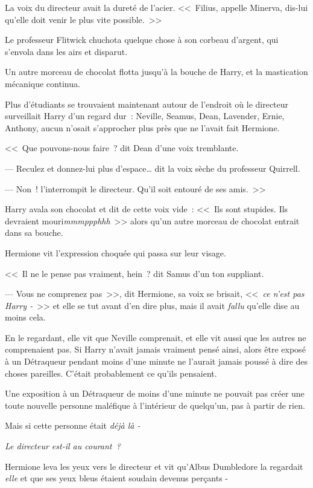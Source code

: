 La voix du directeur avait la dureté de l'acier. <<~Filius, appelle Minerva, dis-lui qu'elle doit venir le plus vite possible.~>>

Le professeur Flitwick chuchota quelque chose à son corbeau d'argent, qui s'envola dans les airs et disparut.

Un autre morceau de chocolat flotta jusqu'à la bouche de Harry, et la mastication mécanique continua.

Plus d'étudiants se trouvaient maintenant autour de l'endroit où le directeur surveillait Harry d'un regard dur~: Neville, Seamus, Dean, Lavender, Ernie, Anthony, aucun n'osait s'approcher plus près que ne l'avait fait Hermione.

<<~Que pouvons-nous faire~? dit Dean d'une voix tremblante.

--- Reculez et donnez-lui plus d'espace… dit la voix sèche du professeur Quirrell.

--- Non~! l'interrompit le directeur. Qu'il soit entouré de ses amis.~>>

Harry avala son chocolat et dit de cette voix vide~: <<~Ils sont stupides. Ils devraient mouri\emph{mmmppphhh}~>> alors qu'un autre morceau de chocolat entrait dans sa bouche.

Hermione vit l'expression choquée qui passa sur leur visage.

<<~Il ne le pense pas vraiment, hein~? dit Samus d'un ton suppliant.

--- Vous ne comprenez pas~>>, dit Hermione, sa voix se brisait, <<~\emph{ce n'est pas Harry -}~>> et elle se tut avant d'en dire plus, mais il avait \emph{fallu} qu'elle dise au moins cela.

En le regardant, elle vit que Neville comprenait, et elle vit aussi que les autres ne comprenaient pas. Si Harry n'avait jamais vraiment pensé ainsi, alors être exposé à un Détraqueur pendant moins d'une minute ne l'aurait jamais poussé à dire des choses pareilles. C'était probablement ce qu'ils pensaient.

Une exposition à un Détraqueur de moins d'une minute ne pouvait pas créer une toute nouvelle personne maléfique à l'intérieur de quelqu'un, pas à partir de rien.

Mais si cette personne était \emph{déjà là -}

\emph{Le directeur est-il au courant~?}

Hermione leva les yeux vers le directeur et vit qu'Albus Dumbledore la regardait \emph{elle} et que ses yeux bleus étaient soudain devenus perçants -


